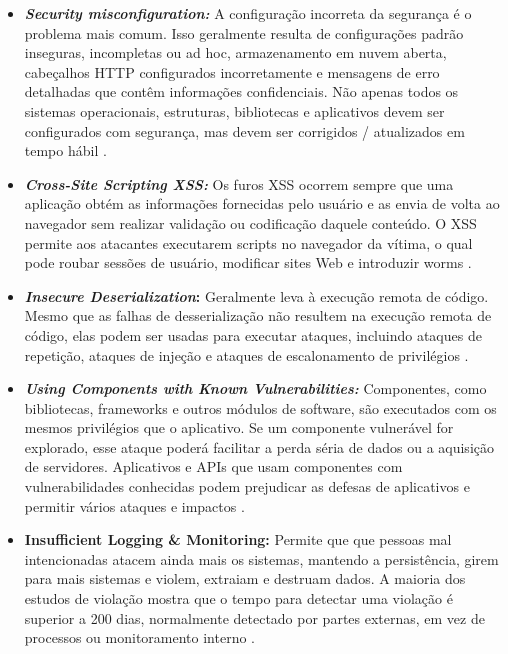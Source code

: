 \begin{itemize}
    \item \textbf{\textit{Security misconfiguration:}}  A configuração incorreta da segurança é o problema mais comum. Isso geralmente resulta de configurações padrão inseguras, incompletas ou ad hoc, armazenamento em nuvem aberta, cabeçalhos HTTP configurados incorretamente e mensagens de erro detalhadas que contêm informações confidenciais. Não apenas todos os sistemas operacionais, estruturas, bibliotecas e aplicativos devem ser configurados com segurança, mas devem ser corrigidos / atualizados em tempo hábil \cite{owasp}. 
    
    \item \textbf{\textit{Cross-Site Scripting XSS:}} Os furos XSS ocorrem sempre que uma aplicação obtém as informações fornecidas pelo usuário e as envia de volta ao navegador sem realizar validação ou codificação daquele conteúdo. O XSS permite aos atacantes executarem scripts no navegador da vítima, o qual pode roubar sessões de usuário, modificar sites Web e introduzir worms \cite{owasp}.
    
    \item\textbf{ \textit{Insecure Deserialization}:} Geralmente leva à execução remota de código. Mesmo que as falhas de desserialização não resultem na execução remota de código, elas podem ser usadas para executar ataques, incluindo ataques de repetição, ataques de injeção e ataques de escalonamento de privilégios \cite{owasp}.
    
    \item \textbf{\textit{Using Components with Known Vulnerabilities:}} Componentes, como bibliotecas, frameworks  e outros módulos de software, são executados com os mesmos privilégios que o aplicativo. Se um componente vulnerável for explorado, esse ataque poderá facilitar a perda séria de dados ou a aquisição de servidores. Aplicativos e APIs que usam componentes com vulnerabilidades conhecidas podem prejudicar as defesas de aplicativos e permitir vários ataques e impactos \cite{owasp}.
    
    \item\textbf{ Insufficient Logging & Monitoring:} Permite que que pessoas mal intencionadas atacem ainda mais os sistemas, mantendo a persistência, girem para mais sistemas e violem, extraiam e destruam dados. A maioria dos estudos de violação mostra que o tempo para detectar uma violação é superior a 200 dias, normalmente detectado por partes externas, em vez de processos ou monitoramento interno \cite{owasp}.
    
\end{itemize}





